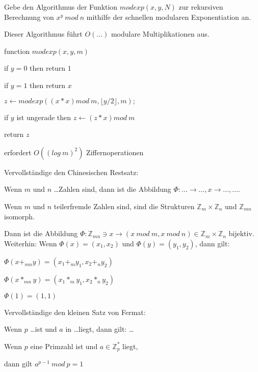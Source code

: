 \documentclass[avery5371, frame]{flashcards}
\begin{document}
\begin{flashcard}[Zahlentheorie]{Gebe den Algorithmus der Funktion $modexp(x,y,N)$ zur rekursiven Berechnung von $x^y\ mod\ n$ mithilfe der schnellen modularen Exponentiation an.

        Dieser Algorithmus führt $O(\dots)$ modulare Multiplikationen aus.}

    function $modexp(x,y,m)$
    \begin{itemize*}
        \item[] if $y= 0$ then return $1$
        \item[] if $y= 1$ then return $x$
        \item[] $z\leftarrow modexp((x*x) mod\ m,\lfloor y/2\rfloor,m);$ %
        \item[] if $y$ ist ungerade then $z\leftarrow (z*x) mod\ m$
        \item[] return $z$
    \end{itemize*}

    erfordert $O((log\ m)^2)$ Ziffernoperationen
\end{flashcard}

\begin{flashcard}[Zahlentheorie]{Vervollständige den Chinesischen Restsatz:

        Wenn $m$ und $n$ \dots Zahlen sind, dann ist die Abbildung $\Phi:\dots\rightarrow\dots, x\rightarrow \dots,\dots$.}
    Wenn $m$ und $n$ teilerfremde Zahlen sind, sind die Strukturen $\mathbb{Z}_m \times\mathbb{Z}_n$ und $\mathbb{Z}_{mn}$ isomorph.

    Dann ist die Abbildung $\Phi:\mathbb{Z}_{mn} \owns x \rightarrow (x\ mod\ m, x\ mod\ n)\in\mathbb{Z}_m\times\mathbb{Z}_n$ bijektiv. Weiterhin: Wenn $\Phi(x)=(x_1,x_2)$ und $\Phi(y)=(y_1,y_2)$, dann gilt:
    \begin{itemize*}
        \item $\Phi(x+_{mn} y) = (x_1 +_m y_1 , x_2 +_n y_2)$
        \item $\Phi(x*_{mn} y) = (x_1 *_m y_1 , x_2 *_n y_2)$
        \item $\Phi(1) = (1,1)$
    \end{itemize*}
\end{flashcard}

\begin{flashcard}[Zahlentheorie]{Vervollständige den kleinen Satz von Fermat:

        Wenn $p$ \dots ist und $a$ in \dots liegt, dann gilt: \dots}
    Wenn $p$ eine Primzahl ist und $a\in\mathbb{Z}^*_p$ liegt,

    dann gilt $a^{p-1}\ mod\ p= 1$
\end{flashcard}
\end{document}
